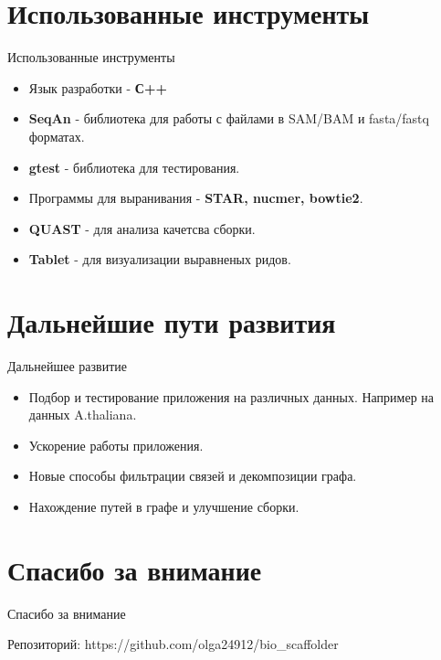 \documentclass{beamer}
\newcommand{\cimg}[2]{%
	\begin{center}%
		\ifthenelse{\equal{#2}{}}{%
			\texttt{[image: \#1]}
		}{%
			\texttt{[image: \#1]}
		}%
	\end{center}%
}
\begin{document}
\section{Использованные инструменты}
\begin{frame}[t]{Использованные инструменты}
\begin{itemize}
	\item Язык разработки - \textbf{С++}
	\item \textbf{SeqAn} - библиотека для работы с 
	файлами в SAM/BAM и fasta/fastq форматах.  
	\item \textbf{gtest} - библиотека для тестирования.
	\item Программы для выранивания - \textbf{STAR, nucmer, bowtie2}. 
	\item \textbf{QUAST} - для анализа качетсва сборки. 
	\item \textbf{Tablet} - для визуализации выравненых ридов. 
\end{itemize}
\end{frame}

\section{Дальнейшие пути развития}
\begin{frame}[t]{Дальнейшее развитие}
	\begin{itemize}
		\item Подбор и тестирование 
		приложения на различных 
		данных. Например на данных A.thaliana.
		\cimg{athaliana.jpg}{0.20}
		
		\item Ускорение работы приложения. 
		
		\item Новые способы фильтрации связей и декомпозиции графа. 
		
		\item Нахождение путей в графе и улучшение сборки. 
	\end{itemize}
\end{frame}

\section{Спасибо за внимание}
\begin{frame}{Спасибо за внимание}
    \begin{center}
        Репозиторий: https://github.com/olga24912/bio\_scaffolder
    \end{center}
\end{frame}
\end{document}

